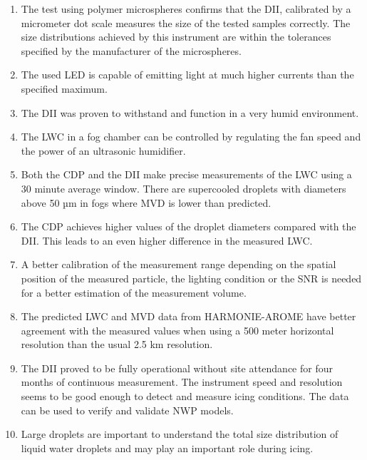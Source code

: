 \begin{enumerate}
\item
The test using polymer microspheres confirms that the DII, calibrated by a micrometer dot scale measures the size of the tested samples correctly. The size distributions achieved by this instrument are within the tolerances specified by the manufacturer of the microspheres.

\item
The used LED is capable of emitting light at much higher currents than the specified maximum.

\item
The DII was proven to withstand and function in a very humid environment. 

\item
The LWC in a fog chamber can be controlled by regulating the fan speed and the power of an ultrasonic humidifier. 

\item
Both the CDP and the DII make precise measurements of the LWC using a 30 minute average window. There are supercooled droplets with diameters above 50 µm in fogs where MVD is lower than predicted.

\item
The CDP achieves higher values of the droplet diameters compared with the DII. This leads to an even higher difference in the measured LWC.

\item
A better calibration of the measurement range depending on the spatial position of the measured particle, the lighting condition or the SNR is needed for a better estimation of the measurement volume.

\item
The predicted LWC and MVD data from HARMONIE-AROME have better agreement with the measured values when using a 500 meter horizontal resolution than the usual 2.5 km resolution.

\item
The DII proved to be fully operational without site attendance for four months of continuous measurement. The instrument speed and resolution seems to be good enough to detect and measure icing conditions. The data can be used to verify and validate NWP models.

\item
Large droplets are important to understand the total size distribution of liquid water droplets and may play an important role during icing. 

\end{enumerate}

